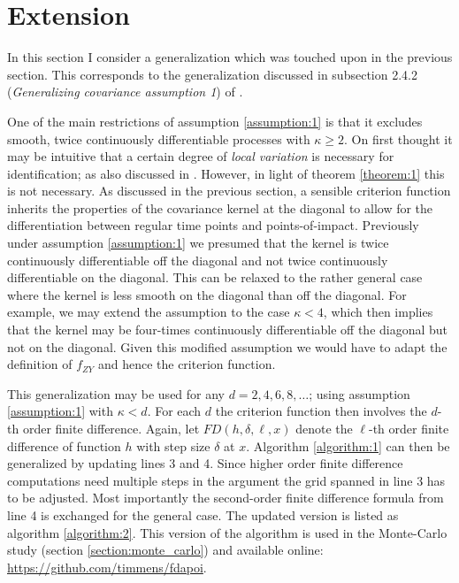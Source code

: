 \section{Extension}
\label{section:extension}

In this section I consider a generalization which was touched upon in the previous
section. This corresponds to the generalization discussed in subsection 2.4.2
(\emph{Generalizing covariance assumption 1}) of \cite{Kneip2020}.

One of the main restrictions of assumption \ref{assumption:1} is that it excludes
smooth, twice continuously differentiable processes with $\kappa \geq 2$. On first
thought it may be intuitive that a certain degree of \emph{local variation} is necessary
for identification; as also discussed in \cite{Kneip2016}. However, in light of theorem
\ref{theorem:1} this is not necessary. As discussed in the previous section, a sensible
criterion function inherits the properties of the covariance kernel at the diagonal to
allow for the differentiation between regular time points and points-of-impact.
Previously under assumption \ref{assumption:1} we presumed that the kernel is twice
continuously differentiable off the diagonal and not twice continuously differentiable
on the diagonal. This can be relaxed to the rather general case where the kernel is
less smooth on the diagonal than off the diagonal. For example, we may extend the
assumption to the case $\kappa < 4$, which then implies that the kernel may be
four-times continuously differentiable off the diagonal but not on the diagonal. Given
this modified assumption we would have to adapt the definition of $f_{ZY}$ and hence the
criterion function.

This generalization may be used for any $d = 2, 4, 6, 8, \dots$; using assumption
\ref{assumption:1} with $\kappa < d$. For each $d$ the criterion function then involves
the $d$-th order finite difference. Again, let $FD(h, \delta, \ell, x)$ denote the
$\ell$-th order finite difference of function $h$ with step size $\delta$ at $x$.
Algorithm \ref{algorithm:1} can then be generalized by updating lines 3 and 4. Since
higher order finite difference computations need multiple steps in the argument the grid
spanned in line 3 has to be adjusted. Most importantly the second-order finite
difference formula from line 4 is exchanged for the general case. The updated version is
listed as algorithm \ref{algorithm:2}. This version of the algorithm is used in the
Monte-Carlo study (section \ref{section:monte_carlo}) and available online:
\url{https://github.com/timmens/fdapoi}.

